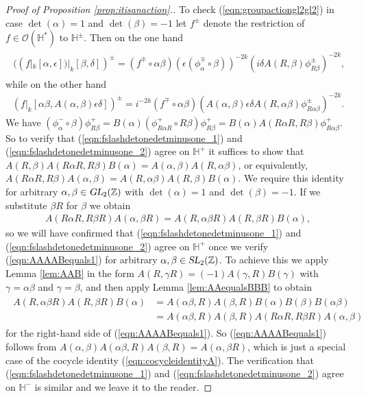 \documentclass[aps,prd,groupedaddress,preprint,tightenlines,eqsecnum,nofootinbib]{revtex4}
\newcommand{\g}{\gamma}
\newcommand{\e}{\epsilon}
\newcommand{\SL}{\operatorname{\textsl{SL}}}      %
\newcommand{\GL}{\operatorname{\textsl{GL}}}      %
\newcommand{\Z}{{\mathbb Z}}%
\newcommand{\HH}{{\mathbb H}}%
\newcommand{\A}{\alpha}
\newcommand{\B}{\beta}
\begin{document}
\begin{proof}[Proof of Proposition \ref{prop:itisanaction}.]
To check (\ref{eqn:groupactiongl2gl2}) in case $\det(\A)=1$ and $\det(\B)=-1$ let $f^\pm$ denote the restriction of $f\in\mathcal{O}(\HH^*)$ to $\HH^\pm$. Then on the one hand
\begin{gather}
\begin{split}\label{eqn:fslashdetonedetminusone_1}
((f|_k[\A,\e])|_k[\B,\delta])^\pm 
=(f^\mp\circ \A\B)(\e(\phi_\A^\mp\circ\B))^{-2k}(i\delta A(R,\B) \phi^\pm_{R\B})^{-2k},
\end{split}
\end{gather}
while on the other hand 
\begin{gather}\label{eqn:fslashdetonedetminusone_2}
(f|_k[\A\B,A(\A,\B)\e\delta])^\pm=i^{-2k}(f^\mp\circ \A\B)(A(\A,\B)\e\delta A(R,\A\B)\phi^\pm_{R\A\B})^{-2k}. 
\end{gather}
We have $(\phi^-_\A\circ\B)\phi^+_{R\B}=B(\A)(\phi^+_{R\A R}\circ R\B)\phi^+_{R\B}=B(\A) A(R\A R,R\B)\phi^+_{R\A\B}$. So to verify that (\ref{eqn:fslashdetonedetminusone_1}) and (\ref{eqn:fslashdetonedetminusone_2}) agree on $\HH^+$ it suffices to show that $A(R,\B)  A(R\A R,R\B ) B(\A)=A(\A ,\B) A(R,\A\B)$, or equivalently, 
	$A(R\A R,R\B ) 
	A(\A ,\B) 
	=
	A(R,\A\B)
	A(R,\B) 
	B(\A)$.
We require this identity for arbitrary $\A,\B\in \GL_2(\Z)$ with $\det(\A)=1$ and $\det(\B)=-1$. If we substitute $\B R$ for $\B$ we obtain 
\begin{gather}\label{eqn:AAAABequals1}
	A(R\A R,R\B R) 
	A(\A ,\B R) 
	=
	A(R,\A\B R)
	A(R,\B R) 
	B(\A),
\end{gather}
so we will have confirmed that (\ref{eqn:fslashdetonedetminusone_1}) and (\ref{eqn:fslashdetonedetminusone_2}) agree on $\HH^+$ once we verify (\ref{eqn:AAAABequals1}) for arbitrary $\A,\B\in \SL_2(\Z)$. To achieve this we apply Lemma \ref{lem:AAB} in the form $A(R,\g R)=(-1)A(\g,R)B(\g)$ with $\g=\A\B$ and $\g=\B$, and then apply Lemma \ref{lem:AAequalsBBB} to obtain
\begin{gather}
\begin{split}
	A(R,\A\B R)A(R, \B R) B(\A)&=A(\A\B,R)A(\B,R)B(\A) B(\B) B(\A\B)\\
	&=A(\A\B,R) A(\B,R) A(R\A R,R\B R) A(\A,\B)
\end{split}
\end{gather}
for the right-hand side of (\ref{eqn:AAAABequals1}). So (\ref{eqn:AAAABequals1}) follows from $A(\A,\B) A(\A\B,R) A(\B,R) =A(\A,\B R)$, which is just a special case of the cocycle identity (\ref{eqn:cocycleidentityA}). The verification that (\ref{eqn:fslashdetonedetminusone_1}) and (\ref{eqn:fslashdetonedetminusone_2}) agree on $\HH^-$ is similar and we leave it to the reader.



\end{proof}
\end{document}
